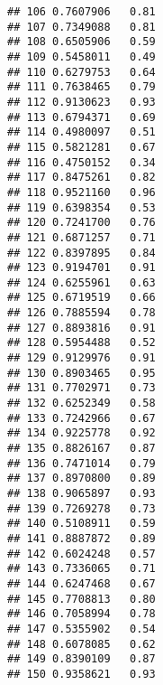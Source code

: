 \documentclass[
]{article}
\begin{document}
\begin{verbatim}
## 106 0.7607906   0.81
## 107 0.7349088   0.81
## 108 0.6505906   0.59
## 109 0.5458011   0.49
## 110 0.6279753   0.64
## 111 0.7638465   0.79
## 112 0.9130623   0.93
## 113 0.6794371   0.69
## 114 0.4980097   0.51
## 115 0.5821281   0.67
## 116 0.4750152   0.34
## 117 0.8475261   0.82
## 118 0.9521160   0.96
## 119 0.6398354   0.53
## 120 0.7241700   0.76
## 121 0.6871257   0.71
## 122 0.8397895   0.84
## 123 0.9194701   0.91
## 124 0.6255961   0.63
## 125 0.6719519   0.66
## 126 0.7885594   0.78
## 127 0.8893816   0.91
## 128 0.5954488   0.52
## 129 0.9129976   0.91
## 130 0.8903465   0.95
## 131 0.7702971   0.73
## 132 0.6252349   0.58
## 133 0.7242966   0.67
## 134 0.9225778   0.92
## 135 0.8826167   0.87
## 136 0.7471014   0.79
## 137 0.8970800   0.89
## 138 0.9065897   0.93
## 139 0.7269278   0.73
## 140 0.5108911   0.59
## 141 0.8887872   0.89
## 142 0.6024248   0.57
## 143 0.7336065   0.71
## 144 0.6247468   0.67
## 145 0.7708813   0.80
## 146 0.7058994   0.78
## 147 0.5355902   0.54
## 148 0.6078085   0.62
## 149 0.8390109   0.87
## 150 0.9358621   0.93
\end{verbatim}
\end{document}
